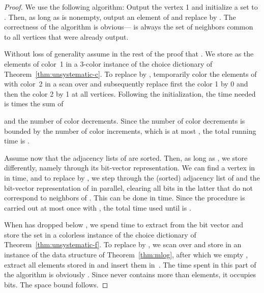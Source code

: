 \documentclass[envcountsame,envcountsect,undated,nolinenumbers]{lnthi}
\begin{document}
\begin{proof}
We use the following algorithm:
Output the vertex 1 and initialize a set
 to .
Then, as long as  is nonempty,
output an element  of  and replace
 by .
The correctness of the algorithm
is obvious--- is always the set of neighbors common to all vertices that
were already output.

Without loss of generality assume in the
rest of the proof that .
We store  as the elements of
color~1 in a 3-color
instance of the choice dictionary
of Theorem~\ref{thm:unsystematic-c}.
To replace  by ,
temporarily color the elements of 
with color~2 in a scan over 
and subsequently replace
first the color 1 by 0 and then the
color 2 by 1 at all vertices.
Following the initialization,
the time needed is  times the sum of

and the number of color decrements.
Since the number of color decrements is bounded by
the number of color increments,
which is at most ,
the total running time is
.

Assume now that the adjacency lists of  are sorted.
Then, as long as , we store 
differently, namely through its bit-vector representation.
We can find a vertex  in  in  time,
and to replace  by , we step
through the (sorted) adjacency list of 
and the bit-vector representation of  in parallel,
clearing all bits in the latter that do not
correspond to neighbors of .
This can be done in  time.
Since the procedure is carried out at most once
with , the total time used
until  is .

When  has dropped below , we spend 
time to extract  from the bit vector and store the
set in a colorless instance  of the choice dictionary
of Theorem~\ref{thm:unsystematic-f}.
To replace  by , we scan
over  and store  in an instance 
of the data structure of Theorem~\ref{thm:mlog},
after which we empty , extract all elements
stored in  and insert them in~.
The time spent in this part of the algorithm
is obviously .
Since  never contains more than  elements,
it occupies  bits.
The space bound follows.
\end{proof}


\end{document}
